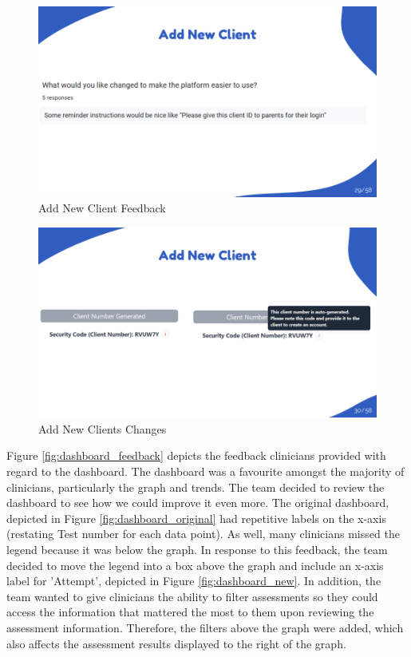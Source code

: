 \documentclass{article}
\begin{document}
\begin{figure}[H]
  \centering
  \includegraphics[width=\textwidth]{images/slide29.png}
  \caption{Add New Client Feedback}
  \label{fig:new_client_feedback}
\end{figure}

\begin{figure}[H]
  \centering
  \includegraphics[width=\textwidth]{images/slide30.png}
  \caption{Add New Clients Changes}
  \label{fig:new_client_changes}
\end{figure}

Figure \ref{fig:dashboard_feedback} depicts the feedback clinicians provided with regard to the dashboard. The dashboard was a favourite amongst the majority of clinicians, particularly the graph and trends.
The team decided to review the dashboard to see how we could improve it even more. The original dashboard, depicted in Figure \ref{fig:dashboard_original} had repetitive labels on the x-axis (restating Test number for each data point).
As well, many clinicians missed the legend because it was below the graph.
In response to this feedback, the team decided to move the legend into a box above the graph and include an x-axis label for 'Attempt', depicted in Figure \ref{fig:dashboard_new}. In addition, the team wanted to give clinicians the ability to filter
assessments so they could access the information that mattered the most to them upon reviewing the assessment information. Therefore, the filters above the graph were added, which also affects the assessment results displayed to the right of the graph.
\end{document}
